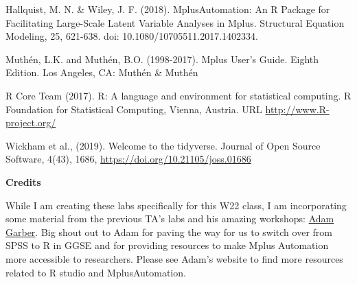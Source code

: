 \documentclass[
]{article}
\begin{document}
Hallquist, M. N. \& Wiley, J. F. (2018). MplusAutomation: An R Package
for Facilitating Large-Scale Latent Variable Analyses in Mplus.
Structural Equation Modeling, 25, 621-638. doi:
10.1080/10705511.2017.1402334.

Muthén, L.K. and Muthén, B.O. (1998-2017). Mplus User's Guide. Eighth
Edition. Los Angeles, CA: Muthén \& Muthén

R Core Team (2017). R: A language and environment for statistical
computing. R Foundation for Statistical Computing, Vienna, Austria. URL
\url{http://www.R-project.org/}

Wickham et al., (2019). Welcome to the tidyverse. Journal of Open Source
Software, 4(43), 1686, \url{https://doi.org/10.21105/joss.01686}

\textbf{Credits}

While I am creating these labs specifically for this W22 class, I am
incorporating some material from the previous TA's labs and his amazing
workshops: \href{https://garberadamc.github.io/project-site/}{Adam
Garber}. Big shout out to Adam for paving the way for us to switch over
from SPSS to R in GGSE and for providing resources to make Mplus
Automation more accessible to researchers. Please see Adam's website to
find more resources related to R studio and MplusAutomation.
\end{document}
